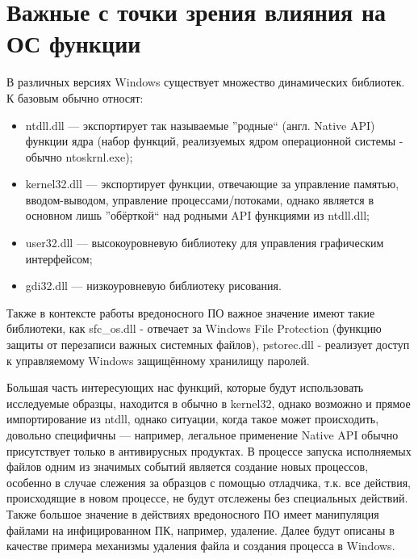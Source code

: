\section {Важные с точки зрения влияния на ОС функции}
В различных версиях Windows существует множество динамических библиотек. К базовым обычно относят:
\begin {itemize}
	\item ntdll.dll --- экспортирует так называемые ''родные`` (англ. Native API) функции ядра (набор функций, реализуемых ядром операционной системы - обычно ntoskrnl.exe);
	\item kernel32.dll --- экспортирует функции, отвечающие за управление памятью, вводом-выводом, управление процессами/потоками, однако является в основном лишь ''обёрткой`` над родными API функциями из ntdll.dll;
	\item user32.dll --- высокоуровневую библиотеку для управления графическим интерфейсом;
	\item gdi32.dll --- низкоуровневую библиотеку рисования.
\end {itemize}
Также в контексте работы вредоносного ПО важное значение имеют такие библиотеки, как sfc_os.dll - отвечает за Windows File Protection (функцию защиты от перезаписи важных системных файлов), pstorec.dll - реализует доступ к управляемому Windows защищённому хранилищу паролей.

Большая часть интересующих нас функций, которые будут использовать исследуемые образцы, находится в обычно в kernel32, однако возможно и прямое импортирование  из ntdll, однако ситуации, когда такое может происходить, довольно специфичны --- например, легальное применение Native API обычно присутствует только в антивирусных продуктах.
В процессе запуска исполняемых файлов одним из значимых событий является создание новых процессов, особенно в случае слежения за образцов с помощью отладчика, т.к. все действия, происходящие в новом процессе, не будут отслежены без специальных действий. Также большое значение в действиях вредоносного ПО имеет манипуляция файлами на инфицированном ПК, например, удаление. Далее будут описаны в качестве примера механизмы удаления файла и создания процесса в Windows.


